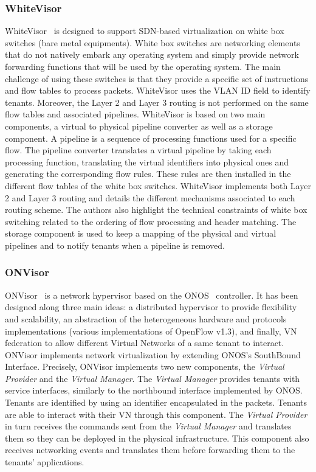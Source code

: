 \subsubsection{WhiteVisor}
WhiteVisor~\cite{whitevisor-Yu2019} is designed to support SDN-based virtualization on white box switches (\ie bare metal equipments).
White box switches are networking elements that do not natively embark any operating system and simply provide network forwarding functions that will be used by the operating system.  
The main challenge of using these switches is that they provide a specific set of instructions and flow tables to process packets. 
WhiteVisor uses the VLAN ID field to identify tenants.
Moreover, the Layer 2 and Layer 3 routing is not performed on the same flow tables and associated pipelines.
WhiteVisor is based on two main components, a virtual to physical pipeline converter as well as a storage component.
A pipeline is a sequence of processing functions used for a specific flow.
The pipeline converter translates a virtual pipeline by taking each processing function, translating the virtual identifiers into physical ones and generating the corresponding flow rules. These rules are then installed in the different flow tables of the white box switches. WhiteVisor implements both Layer 2 and Layer 3 routing and details the different mechanisms associated to each routing scheme. The authors also highlight the technical constraints of white box switching related to the ordering of flow processing and header matching. The storage component is used to keep a mapping of the physical and virtual pipelines and to notify tenants when a pipeline is removed. 


\subsubsection{ONVisor}
ONVisor~\cite{ONVisor-Han2018} is a network hypervisor based on the ONOS~\cite{onos-Berde2014a} controller.
It has been designed along three main ideas: a distributed hypervisor to provide flexibility and scalability, an abstraction of the heterogeneous hardware and protocols implementations (\eg various implementations of OpenFlow v1.3), and finally, VN federation to allow different Virtual Networks of a same tenant to interact.
ONVisor implements network virtualization by extending ONOS's SouthBound Interface.
Precisely, ONVisor implements two new components, the \textit{Virtual Provider} and the \textit{Virtual Manager}.
The \textit{Virtual Manager} provides tenants with service interfaces, similarly to the northbound interface implemented by ONOS. 
Tenants are identified by using an identifier encapsulated in the packets.
Tenants are able to interact with their VN through this component.
The \textit{Virtual Provider} in turn receives the commands sent from the \textit{Virtual Manager} and translates them so they can be deployed in the physical infrastructure. This component also receives networking events and translates them before forwarding them to the tenants' applications.

